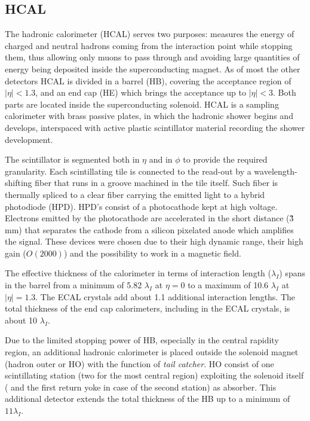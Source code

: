 \subsection{HCAL}

The hadronic calorimeter (HCAL) serves two purposes: measures the energy of charged and neutral hadrons coming from the interaction point while stopping them, thus allowing only muons to pass through and avoiding large quantities of energy being deposited inside the superconducting magnet. As of most the other detectors HCAL is divided in a barrel (HB), covering the acceptance region of $|\eta| < 1.3$, and an end cap (HE) which brings the acceptance up to $|\eta| < 3$. Both parts are located inside the superconducting solenoid. HCAL is a sampling calorimeter with brass passive plates, in which the hadronic shower begins and develops, interspaced with active plastic scintillator material recording the shower development. 

The scintillator is segmented both in $\eta$ and in $\phi$ to provide the required granularity. Each scintillating tile is connected to the read-out by a wavelength-shifting fiber that runs in a groove machined in the tile itself. Such fiber is thermally spliced to a clear fiber carrying the emitted light to a hybrid photodiode (HPD). HPD's consist of a photocathode kept at high voltage. Electrons emitted by the photocathode are accelerated in the short distance (\~3 mm) that separates the cathode from a silicon pixelated anode which amplifies the signal. These devices were chosen due to their high dynamic range, their high gain ($O(2000)$) and the possibility to work in a magnetic field.

The effective thickness of the calorimeter in terms of interaction length ($\lambda_I$) spans in the barrel from a minimum of 5.82 $\lambda_I$ at $\eta=0$ to a maximum of 10.6 $\lambda_I$ at $|\eta| = 1.3$. The ECAL crystals add about 1.1 additional interaction lengths. The total thickness of the end cap calorimeters, including in the ECAL crystals, is about 10 $\lambda_I$.

Due to the limited stopping power of HB, especially in the central rapidity region, an additional hadronic calorimeter is placed outside the solenoid magnet (hadron outer or HO) with the function of \emph{tail catcher}. HO consist of one scintillating station (two for the most central region) exploiting the solenoid itself ( and the first return yoke in case of the second station) as absorber. This additional detector extends the total thickness of the HB up to a minimum of $11 \lambda_I$.

